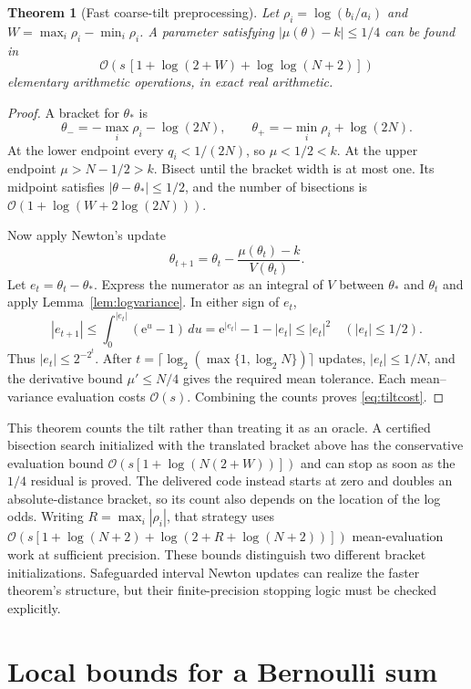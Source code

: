 \documentclass[11pt,a4paper]{article}
\newtheorem{theorem}{Theorem}[section]
\theoremstyle{definition}
\newcommand{\ee}{\mathrm e}
\newcommand{\abs}[1]{\left|#1\right|}
\newcommand{\BigO}{\mathcal O}
\begin{document}
\begin{theorem}[Fast coarse-tilt preprocessing]\label{thm:newton}
Let $\rho_i=\log(b_i/a_i)$ and $W=\max_i\rho_i-\min_i\rho_i$. A parameter satisfying $\abs{\mu(\theta)-k}\le1/4$ can be found in
\begin{equation}\label{eq:tiltcost}
 \BigO\!\left(s\,[1+\log(2+W)+\log\log(N+2)]\right)
\end{equation}
elementary arithmetic operations, in exact real arithmetic.
\end{theorem}
\begin{proof}
A bracket for $\theta_*$ is
\[
 \theta_-=-\max_i\rho_i-\log(2N),\qquad
 \theta_+=-\min_i\rho_i+\log(2N).
\]
At the lower endpoint every $q_i<1/(2N)$, so $\mu<1/2<k$. At the upper endpoint $\mu>N-1/2>k$. Bisect until the bracket width is at most one. Its midpoint satisfies $\abs{\theta-\theta_*}\le1/2$, and the number of bisections is
$\BigO(1+\log(W+2\log(2N)))$.

Now apply Newton's update
\[
 \theta_{t+1}=\theta_t-\frac{\mu(\theta_t)-k}{V(\theta_t)}.
\]
Let $e_t=\theta_t-\theta_*$. Express the numerator as an integral of $V$ between $\theta_*$ and $\theta_t$ and apply Lemma~\ref{lem:logvariance}. In either sign of $e_t$,
\[
 \abs{e_{t+1}}\le\int_0^{\abs{e_t}}(\ee^u-1)\,du
 =\ee^{\abs{e_t}}-1-\abs{e_t}\le\abs{e_t}^2
 \quad(\abs{e_t}\le1/2).
\]
Thus $\abs{e_t}\le2^{-2^t}$. After
$t=\lceil\log_2(\max\{1,\log_2N\})\rceil$ updates, $\abs{e_t}\le1/N$, and the derivative bound $\mu'\le N/4$ gives the required mean tolerance. Each mean--variance evaluation costs $\BigO(s)$. Combining the counts proves \eqref{eq:tiltcost}.
\end{proof}

This theorem counts the tilt rather than treating it as an oracle. A certified bisection search initialized with the translated bracket above has the conservative evaluation bound
$\BigO(s[1+\log(N(2+W))])$ and can stop as soon as the $1/4$ residual is proved. The delivered code instead starts at zero and doubles an absolute-distance bracket, so its count also depends on the location of the log odds. Writing $R=\max_i\abs{\rho_i}$, that strategy uses
$\BigO(s[1+\log(N+2)+\log(2+R+\log(N+2))])$
mean-evaluation work at sufficient precision. These bounds distinguish two different bracket initializations. Safeguarded interval Newton updates can realize the faster theorem's structure, but their finite-precision stopping logic must be checked explicitly.

\section{Local bounds for a Bernoulli sum}\label{sec:local}
\end{document}
